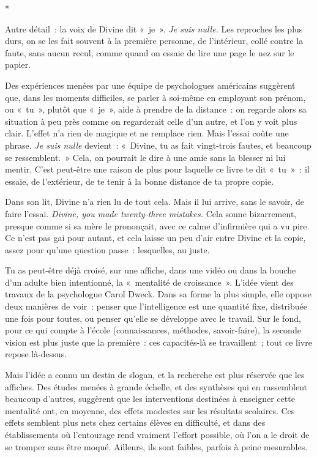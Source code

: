 \documentclass[10.5pt,twoside,openright]{book}
\newcommand{\asterisme}{\par\vspace{0.7em}\centerline{\color{gris}*\quad*\quad*}\vspace{0.7em}\par\noindent}
\begin{document}
\asterisme

Autre détail : la voix de Divine dit « je ». \emph{Je suis nulle.} Les reproches les plus durs, on se les fait souvent à la première personne, de l’intérieur, collé contre la faute, sans aucun recul, comme quand on essaie de lire une page le nez sur le papier.

Des expériences menées par une équipe de psychologues américains suggèrent que, dans les moments difficiles, se parler à soi-même en employant son prénom, ou « tu », plutôt que « je », aide à prendre de la distance : on regarde alors sa situation à peu près comme on regarderait celle d’un autre, et l’on y voit plus clair. L’effet n’a rien de magique et ne remplace rien. Mais l’essai coûte une phrase. \emph{Je suis nulle} devient : « Divine, tu as fait vingt-trois fautes, et beaucoup se ressemblent. » Cela, on pourrait le dire à une amie sans la blesser ni lui mentir. C’est peut-être une raison de plus pour laquelle ce livre te dit « tu » : il essaie, de l’extérieur, de te tenir à la bonne distance de ta propre copie.

Dans son lit, Divine n’a rien lu de tout cela. Mais il lui arrive, sans le savoir, de faire l’essai. \emph{Divine, you made twenty-three mistakes.} Cela sonne bizarrement, presque comme si sa mère le prononçait, avec ce calme d’infirmière qui a vu pire. Ce n’est pas gai pour autant, et cela laisse un peu d’air entre Divine et la copie, assez pour qu’une question passe : lesquelles, au juste.

Tu as peut-être déjà croisé, sur une affiche, dans une vidéo ou dans la bouche d’un adulte bien intentionné, la « mentalité de croissance ». L’idée vient des travaux de la psychologue Carol Dweck. Dans sa forme la plus simple, elle oppose deux manières de voir : penser que l’intelligence est une quantité fixe, distribuée une fois pour toutes, ou penser qu’elle se développe avec le travail. Sur le fond, pour ce qui compte à l’école (connaissances, méthodes, savoir-faire), la seconde vision est plus juste que la première : ces capacités-là se travaillent ; tout ce livre repose là-dessus.

Mais l’idée a connu un destin de slogan, et la recherche est plus réservée que les affiches. Des études menées à grande échelle, et des synthèses qui en rassemblent beaucoup d’autres, suggèrent que les interventions destinées à enseigner cette mentalité ont, en moyenne, des effets modestes sur les résultats scolaires. Ces effets semblent plus nets chez certains élèves en difficulté, et dans des établissements où l’entourage rend vraiment l’effort possible, où l’on a le droit de se tromper sans être moqué. Ailleurs, ils sont faibles, parfois à peine mesurables.
\end{document}
